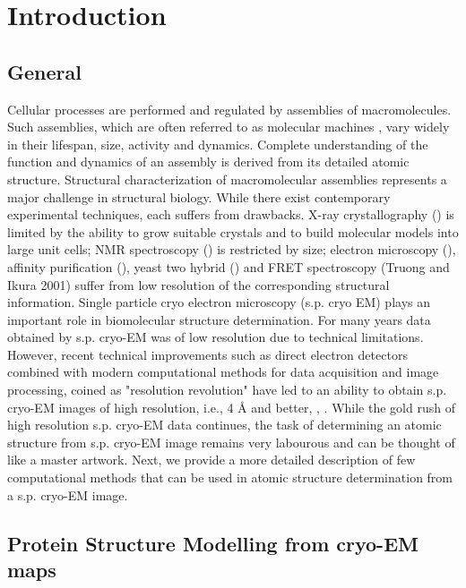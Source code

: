 \section{Introduction}
\subsection{General}
Cellular processes are performed and regulated by assemblies of macromolecules. Such assemblies, which are often referred to as molecular machines \cite{Alberts1998TheMachines}, vary widely in their lifespan, size, activity and dynamics. Complete understanding of the function and dynamics of an assembly is derived from its detailed atomic structure.
Structural characterization of macromolecular assemblies  represents a major challenge in structural biology.
While there exist contemporary experimental techniques, each suffers from  drawbacks. X-ray crystallography (\cite{Drenth1999PrinciplesSeparation}) is limited by the ability to grow suitable crystals and to build molecular models into large unit cells; NMR spectroscopy (\cite{Riek2002SolutionStructures}) is restricted by size; electron microscopy (\cite{BAUMEISTER2000624}), affinity purification (\cite{Bauer2003AffinityComplexes}), yeast two hybrid (\cite{PARRISH2006387}) and FRET spectroscopy (Truong and Ikura 2001) suffer from low resolution of the corresponding structural information.
Single particle cryo electron microscopy (s.p. cryo EM) plays an important role in biomolecular structure determination.
For many years data obtained by s.p. cryo-EM was of low resolution due to technical limitations. However, recent technical improvements such as direct electron detectors combined with modern computational methods for data acquisition and image processing, coined as "resolution revolution" have led  to an ability to obtain s.p. cryo-EM images of high resolution, i.e., 4 {\AA} and better, \cite{Venien-Bryan2017}, \cite{Dubochet2018}. 
While the gold rush of high resolution s.p. cryo-EM data continues, the task of determining an atomic structure from s.p. cryo-EM image remains very labourous and can be thought of like a master artwork.
 Next, we provide a more detailed description of  few computational methods that can be used in atomic structure determination from a s.p. cryo-EM image.

\subsection{Protein Structure Modelling from cryo-EM maps}
